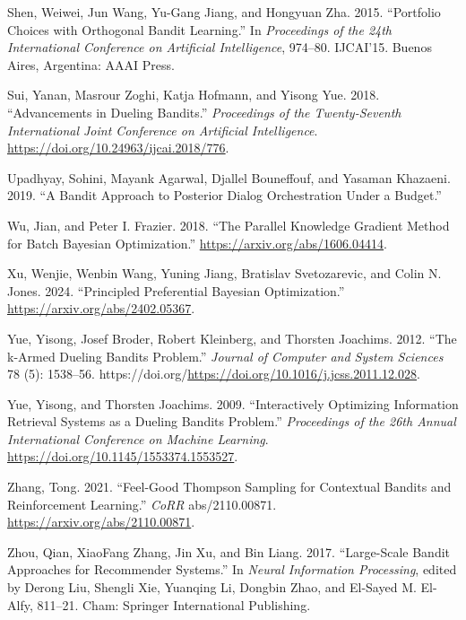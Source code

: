 \documentclass[
  letterpaper,
  numbers=noenddot,
  DIV=11]{scrreprt}
\newlength{\cslhangindent}
\newenvironment{CSLReferences}[2] %
 {\begin{list}{}{%
  \setlength{\itemindent}{0pt}
  \setlength{\leftmargin}{0pt}
  \setlength{\parsep}{0pt}
  \ifodd #1
   \setlength{\leftmargin}{\cslhangindent}
   \setlength{\itemindent}{-1\cslhangindent}
  \fi
  \setlength{\itemsep}{#2\baselineskip}}}
 {\end{list}}
\theoremstyle{definition}
\theoremstyle{plain}
\theoremstyle{plain}
\theoremstyle{remark}
\begin{document}
\begin{CSLReferences}{1}{0}
Shen, Weiwei, Jun Wang, Yu-Gang Jiang, and Hongyuan Zha. 2015.
{``Portfolio Choices with Orthogonal Bandit Learning.''} In
\emph{Proceedings of the 24th International Conference on Artificial
Intelligence}, 974--80. IJCAI'15. Buenos Aires, Argentina: AAAI Press.

Sui, Yanan, Masrour Zoghi, Katja Hofmann, and Yisong Yue. 2018.
{``Advancements in Dueling Bandits.''} \emph{Proceedings of the
Twenty-Seventh International Joint Conference on Artificial
Intelligence}. \url{https://doi.org/10.24963/ijcai.2018/776}.

Upadhyay, Sohini, Mayank Agarwal, Djallel Bouneffouf, and Yasaman
Khazaeni. 2019. {``A Bandit Approach to Posterior Dialog Orchestration
Under a Budget.''}

Wu, Jian, and Peter I. Frazier. 2018. {``The Parallel Knowledge Gradient
Method for Batch Bayesian Optimization.''}
\url{https://arxiv.org/abs/1606.04414}.

Xu, Wenjie, Wenbin Wang, Yuning Jiang, Bratislav Svetozarevic, and Colin
N. Jones. 2024. {``Principled Preferential Bayesian Optimization.''}
\url{https://arxiv.org/abs/2402.05367}.

Yue, Yisong, Josef Broder, Robert Kleinberg, and Thorsten Joachims.
2012. {``The k-Armed Dueling Bandits Problem.''} \emph{Journal of
Computer and System Sciences} 78 (5): 1538--56.
https://doi.org/\url{https://doi.org/10.1016/j.jcss.2011.12.028}.

Yue, Yisong, and Thorsten Joachims. 2009. {``Interactively Optimizing
Information Retrieval Systems as a Dueling Bandits Problem.''}
\emph{Proceedings of the 26th Annual International Conference on Machine
Learning}. \url{https://doi.org/10.1145/1553374.1553527}.

Zhang, Tong. 2021. {``Feel-Good Thompson Sampling for Contextual Bandits
and Reinforcement Learning.''} \emph{CoRR} abs/2110.00871.
\url{https://arxiv.org/abs/2110.00871}.

Zhou, Qian, XiaoFang Zhang, Jin Xu, and Bin Liang. 2017. {``Large-Scale
Bandit Approaches for Recommender Systems.''} In \emph{Neural
Information Processing}, edited by Derong Liu, Shengli Xie, Yuanqing Li,
Dongbin Zhao, and El-Sayed M. El-Alfy, 811--21. Cham: Springer
International Publishing.

\end{CSLReferences}
\end{document}
